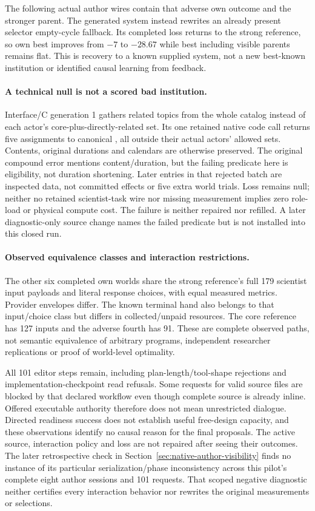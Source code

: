 The following actual author wires contain that adverse own outcome and the
stronger parent. The generated system instead rewrites an already present
selector empty-cycle fallback. Its completed loss returns to the strong
reference, so own best improves from $-7$ to $-28.67$ while best including visible
parents remains flat. This is recovery to a known supplied system, not a new
best-known institution or identified causal learning from feedback.

\paragraph{A technical null is not a scored bad institution.}
Interface/C generation 1 gathers related topics from the whole catalog instead
of each actor's core-plus-directly-related set. Its one retained native code
call returns five assignments to canonical , all outside their
actual actors' allowed sets. Contents, original durations and calendars are
otherwise preserved. The original compound error mentions content/duration,
but the failing predicate here is eligibility, not duration shortening. Later
entries in that rejected batch are inspected data, not committed effects or
five extra world trials. Loss remains null; neither no retained scientist-task
wire nor missing measurement implies zero role-load or physical compute cost.
The failure is neither repaired nor refilled. A later diagnostic-only source
change names the failed predicate but is not installed into this closed run.

\paragraph{Observed equivalence classes and interaction restrictions.}
The other six completed own worlds share the strong reference's full 179
scientist input payloads and literal response choices, with equal measured
metrics. Provider envelopes differ. The known terminal hand also belongs to
that input/choice class but differs in collected/unpaid resources. The core
reference has 127 inputs and the adverse fourth has 91. These are complete
observed paths, not semantic equivalence of arbitrary programs, independent
researcher replications or proof of world-level optimality.

All 101 editor steps remain, including plan-length/tool-shape rejections and
implementation-checkpoint read refusals. Some requests for valid source files
are blocked by that declared workflow even though complete source is already
inline. Offered executable authority therefore does not mean unrestricted
dialogue. Directed readiness success does not establish useful free-design
capacity, and these observations identify no causal reason for the final
proposals. The active source, interaction policy and loss are not repaired
after seeing their outcomes.
The later retrospective check in Section~\ref{sec:native-author-visibility}
finds no instance of its particular serialization/phase inconsistency across
this pilot's complete eight author sessions and 101 requests. That scoped
negative diagnostic neither certifies every interaction behavior nor rewrites
the original measurements or selections.

